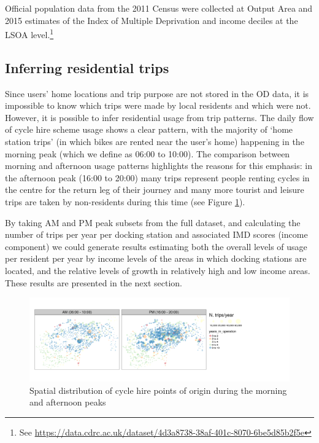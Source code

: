 \documentclass[
]{article}
\begin{document}
Official population data from the 2011 Census were collected at Output Area and 2015 estimates of the Index of Multiple Deprivation and income deciles at the LSOA level.\footnote{
  See \url{https://data.cdrc.ac.uk/dataset/4d3a8738-38af-401c-8070-6be5d85b2f5e}}

\hypertarget{inferring-residential-trips}{%
\subsection{Inferring residential trips}\label{inferring-residential-trips}}

Since users' home locations and trip purpose are not stored in the OD data, it is impossible to know which trips were made by local residents and which were not.
However, it is possible to infer residential usage from trip patterns.
The daily flow of cycle hire scheme usage shows a clear pattern, with the majority of `home station trips' (in which bikes are rented near the user's home) happening in the morning peak (which we define as 06:00 to 10:00).
The comparison between morning and afternoon usage patterns highlights the reasons for this emphasis: in the afternoon peak (16:00 to 20:00) many trips represent people renting cycles in the centre for the return leg of their journey and many more tourist and leisure trips are taken by non-residents during this time (see Figure \ref{fig:map-am-pm-peaks}).

By taking AM and PM peak subsets from the full dataset, and calculating the number of trips per year per docking station and associated IMD scores (income component) we could generate results estimating both the overall levels of usage per resident per year by income levels of the areas in which docking stations are located, and the relative levels of growth in relatively high and low income areas.
These results are presented in the next section.

\begin{figure}

{\centering \includegraphics[width=1\linewidth]{figures/map-am-pm-peaks} 

}

\caption{Spatial distribution of cycle hire points of origin during the morning and afternoon peaks}\label{fig:map-am-pm-peaks}
\end{figure}
\end{document}
